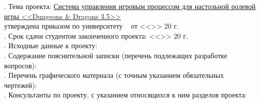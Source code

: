 \begin{titlepage}
. Тема проекта: \uline{Система управления игровым процессом для настольной ролевой игры <<Dungeons \& Dragons 3.5>>\hfill}\\
\noindent утверждена приказом по университету \No~\underline{\hspace{1.5cm}} от <<\underline{\hspace{1cm}}>>\underline{\hspace{3.5cm}} 20\underline{\hspace{0.8cm}} г.\\
. Срок сдачи студентом законченного проекта: \hspace{0.8cm} <<\underline{\hspace{1cm}}>>\underline{\hspace{3.5cm}} 20\underline{\hspace{0.8cm}} г.\\
. Исходные данные к проекту: \uline{\hfill}\\
\noindent \underline{\hspace{\textwidth}}
\noindent \underline{\hspace{\textwidth}}
\noindent \underline{\hspace{\textwidth}}
. Содержание пояснительной записки (перечень подлежащих разработке вопросов): \uline{\hfill}\\
\noindent \underline{\hspace{\textwidth}}
\noindent \underline{\hspace{\textwidth}}
. Перечень графического материала (с точным указанием обязательных чертежей): \uline{\hfill}\\
\noindent \underline{\hspace{\textwidth}}
\noindent \underline{\hspace{\textwidth}}
\noindent \underline{\hspace{\textwidth}}
. Консультанты по проекту, с указанием относящихся к ним разделов проекта: \uline{\hfill}\\
\noindent \underline{\hspace{\textwidth}}
\noindent \underline{\hspace{\textwidth}}
\noindent \underline{\hspace{\textwidth}}
\noindent \underline{\hspace{\textwidth}}

\restoregeometry

\end{titlepage}
